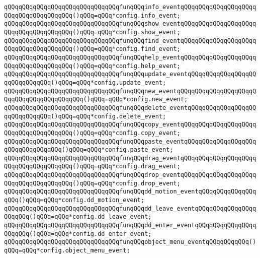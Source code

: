 \verb|qQQqqQQqqQQqqQQqqQQqqQQqqQQqqQQqfunqQQqinfo_eventqQQqqQQqqQQqqQQqqQQqqQQqqQQqqQQqqQQqqQQq()qQQq=qQQq*config.info_event;|\newline
\verb|qQQqqQQqqQQqqQQqqQQqqQQqqQQqqQQqfunqQQqshow_eventqQQqqQQqqQQqqQQqqQQqqQQqqQQqqQQqqQQqqQQq()qQQq=qQQq*config.show_event;|\newline
\verb|qQQqqQQqqQQqqQQqqQQqqQQqqQQqqQQqfunqQQqfind_eventqQQqqQQqqQQqqQQqqQQqqQQqqQQqqQQqqQQqqQQq()qQQq=qQQq*config.find_event;|\newline
\verb|qQQqqQQqqQQqqQQqqQQqqQQqqQQqqQQqfunqQQqhelp_eventqQQqqQQqqQQqqQQqqQQqqQQqqQQqqQQqqQQqqQQq()qQQq=qQQq*config.help_event;|\newline
\verb|qQQqqQQqqQQqqQQqqQQqqQQqqQQqqQQqfunqQQqupdate_eventqQQqqQQqqQQqqQQqqQQqqQQqqQQqqQQq()qQQq=qQQq*config.update_event;|\newline
\verb|qQQqqQQqqQQqqQQqqQQqqQQqqQQqqQQqfunqQQqnew_eventqQQqqQQqqQQqqQQqqQQqqQQqqQQqqQQqqQQqqQQqqQQq()qQQq=qQQq*config.new_event;|\newline
\verb|qQQqqQQqqQQqqQQqqQQqqQQqqQQqqQQqfunqQQqdelete_eventqQQqqQQqqQQqqQQqqQQqqQQqqQQqqQQq()qQQq=qQQq*config.delete_event;|\newline
\verb|qQQqqQQqqQQqqQQqqQQqqQQqqQQqqQQqfunqQQqcopy_eventqQQqqQQqqQQqqQQqqQQqqQQqqQQqqQQqqQQqqQQq()qQQq=qQQq*config.copy_event;|\newline
\verb|qQQqqQQqqQQqqQQqqQQqqQQqqQQqqQQqfunqQQqpaste_eventqQQqqQQqqQQqqQQqqQQqqQQqqQQqqQQqqQQq()qQQq=qQQq*config.paste_event;|\newline
\newline
\verb|qQQqqQQqqQQqqQQqqQQqqQQqqQQqqQQqfunqQQqdrag_eventqQQqqQQqqQQqqQQqqQQqqQQqqQQqqQQqqQQqqQQq()qQQq=qQQq*config.drag_event;|\newline
\verb|qQQqqQQqqQQqqQQqqQQqqQQqqQQqqQQqfunqQQqdrop_eventqQQqqQQqqQQqqQQqqQQqqQQqqQQqqQQqqQQqqQQq()qQQq=qQQq*config.drop_event;|\newline
\verb|qQQqqQQqqQQqqQQqqQQqqQQqqQQqqQQqfunqQQqdd_motion_eventqQQqqQQqqQQqqQQqqQQq()qQQq=qQQq*config.dd_motion_event;|\newline
\verb|qQQqqQQqqQQqqQQqqQQqqQQqqQQqqQQqfunqQQqdd_leave_eventqQQqqQQqqQQqqQQqqQQqqQQq()qQQq=qQQq*config.dd_leave_event;|\newline
\verb|qQQqqQQqqQQqqQQqqQQqqQQqqQQqqQQqfunqQQqdd_enter_eventqQQqqQQqqQQqqQQqqQQqqQQq()qQQq=qQQq*config.dd_enter_event;|\newline
\verb|qQQqqQQqqQQqqQQqqQQqqQQqqQQqqQQqfunqQQqobject_menu_eventqQQqqQQqqQQq()qQQq=qQQq*config.object_menu_event;|\newline
